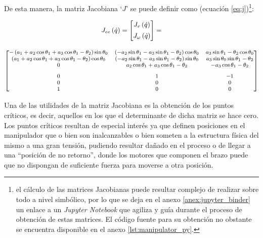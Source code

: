De esta manera, la matriz Jacobiana `$J$' se puede definir como
(ecuación \ref{eq:j})\footnote{el cálculo de las matrices Jacobianas puede resultar
    complejo de realizar sobre todo a nivel simbólico, por lo que se deja en el anexo
    \ref{anex:jupyter_binder} un enlace a un \textit{Jupyter Notebook} que agiliza y guía
    durante el proceso de obtención de estas matrices. El código fuente para su obtención
    no obstante se encuentra disponible en el anexo \ref{lst:manipulator_py}.}:

\begin{gather}\label{eq:j}
    J_{ee}\left(\dot{q}\right) =
    \begin{bmatrix}
        J_v\left(\dot{q}\right) \\[1ex]
        J_{\omega}\left(\dot{q}\right)
    \end{bmatrix} = \\[2ex]
    {\footnotesize
    \begin{bmatrix}
     - \left(a_{1} + a_{2} \cos{\theta_{1}} + a_{3} \cos{\theta_{1} - \theta_{2}}\right) \sin{\theta_{0}} &  \left(- a_{2} \sin{\theta_{1}} - a_{3} \sin{\theta_{1} - \theta_{2}}\right) \cos{\theta_{0}} &  a_{3} \sin{\theta_{1} - \theta_{2}} \cos{\theta_{0}} \\
     \left(a_{1} + a_{2} \cos{\theta_{1}} + a_{3} \cos{\theta_{1} - \theta_{2}}\right) \cos{\theta_{0}} &  \left(- a_{2} \sin{\theta_{1}} - a_{3} \sin{\theta_{1} - \theta_{2}}\right) \sin{\theta_{0}} &  a_{3} \sin{\theta_{0}} \sin{\theta_{1} - \theta_{2}} \\
     0 &  a_{2} \cos{\theta_{1}} + a_{3} \cos{\theta_{1} - \theta_{2}} &  - a_{3} \cos{\theta_{1} - \theta_{2}} \\[2ex]
     0 &  1 &  -1 \\
     0 &  0 &  0 \\
     1 &  0 &  0 \\
    \end{bmatrix}} \nonumber
\end{gather}

Una de las utilidades de la matriz Jacobiana es la obtención de los puntos críticos,
es decir, aquellos en los que el determinante de dicha matriz se hace cero. Los puntos
críticos resultan de especial interés ya que definen posiciones en el manipulador que o
bien son inalcanzables o bien someten a la estructura física del mismo a una gran tensión,
pudiendo resultar dañado en el proceso o de llegar a una ``posición de no retorno'', donde
los motores que componen el brazo puede que no dispongan de suficiente fuerza para moverse a otra
posición.


